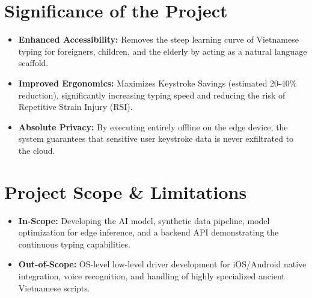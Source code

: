 \section{Significance of the Project}
\begin{itemize}
    \item \textbf{Enhanced Accessibility:} Removes the steep learning curve of Vietnamese typing for foreigners, children, and the elderly by acting as a natural language scaffold.
    \item \textbf{Improved Ergonomics:} Maximizes Keystroke Savings (estimated 20-40\% reduction), significantly increasing typing speed and reducing the risk of Repetitive Strain Injury (RSI).
    \item \textbf{Absolute Privacy:} By executing entirely offline on the edge device, the system guarantees that sensitive user keystroke data is never exfiltrated to the cloud.
\end{itemize}

\section{Project Scope \& Limitations}
\begin{itemize}
    \item \textbf{In-Scope:} Developing the AI model, synthetic data pipeline, model optimization for edge inference, and a backend API demonstrating the continuous typing capabilities.
    \item \textbf{Out-of-Scope:} OS-level low-level driver development for iOS/Android native integration, voice recognition, and handling of highly specialized ancient Vietnamese scripts.
\end{itemize}
